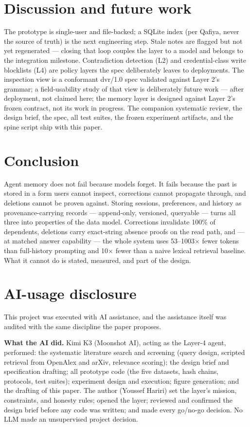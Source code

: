 \documentclass[11pt]{article}
\begin{document}
\section{Discussion and future work}
The prototype is single-user and file-backed; a SQLite index (per Qafiya, never the source of truth) is the next engineering step. Stale notes are flagged but not yet regenerated --- closing that loop couples the layer to a model and belongs to the integration milestone. Contradiction detection (L2) and credential-class write blocklists (L4) are policy layers the spec deliberately leaves to deployments. The inspection view is a conformant dvr/1.0 spec validated against Layer 2's grammar; a field-usability study of that view is deliberately future work --- after deployment, not claimed here; the memory layer is designed against Layer 2's frozen contract, not its work in progress. The companion systematic review, the design brief, the spec, all test suites, the frozen experiment artifacts, and the spine script ship with this paper.

\section{Conclusion}
Agent memory does not fail because models forget. It fails because the past is stored in a form users cannot inspect, corrections cannot propagate through, and deletions cannot be proven against. Storing sessions, preferences, and history as provenance-carrying records --- append-only, versioned, queryable --- turns all three into properties of the data model. Corrections invalidate 100\% of dependents, deletions carry exact-string absence proofs on the read path, and --- at matched answer capability --- the whole system uses 53--1003$\times$ fewer tokens than full-history prompting and 10$\times$ fewer than a naive lexical retrieval baseline. What it cannot do is stated, measured, and part of the design.

\section*{AI-usage disclosure}
This project was executed with AI assistance, and the assistance itself was audited with the same discipline the paper proposes.

\textbf{What the AI did.} Kimi K3 (Moonshot AI), acting as the Layer-4 agent, performed: the systematic literature search and screening (query design, scripted retrieval from OpenAlex and arXiv, relevance scoring); the design brief and specification drafting; all prototype code (the five datasets, hash chains, protocols, test suites); experiment design and execution; figure generation; and the drafting of this paper. The author (Youssef Hariri) set the layer's mission, constraints, and honesty rules; opened the layer; reviewed and confirmed the design brief before any code was written; and made every go/no-go decision. No LLM made an unsupervised project decision.
\end{document}
